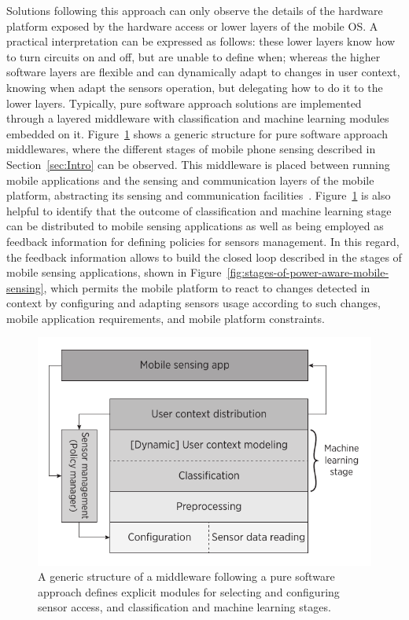 \documentclass[12pt]{article}
\numberwithin{equation}{section}
\numberwithin{table}{section}
\numberwithin{figure}{section}
\begin{document}
Solutions following this approach can only observe the details of the hardware platform exposed by the hardware access or lower layers of the mobile OS.
A practical interpretation can be expressed as follows: these lower layers know how to turn circuits on and off, but are unable to define when; whereas the higher software layers are flexible and can dynamically adapt to changes in user context, knowing when adapt the sensors operation, but delegating how to do it to the lower layers.
Typically, pure software approach solutions are implemented through a layered middleware with classification and machine learning modules embedded on it.
Figure~\ref{fig:middleware-software-approach} shows a generic structure for pure software approach middlewares, where the different stages of mobile phone sensing described in Section~\ref{sec:Intro} can be observed.
This middleware is placed between running mobile applications and the sensing and communication layers of the mobile platform, abstracting its sensing and communication facilities~\cite{Yurur2014}.
Figure~\ref{fig:middleware-software-approach} is also helpful to identify that the outcome of classification and machine learning stage can be distributed to mobile sensing applications as well as being employed as feedback information for defining policies for sensors management.
In this regard, the feedback information allows to build the closed loop described in the stages of mobile sensing applications, shown in Figure~\ref{fig:stages-of-power-aware-mobile-sensing}, which permits the mobile platform to react to changes detected in context by configuring and adapting sensors usage according to such changes, mobile application requirements, and mobile platform constraints.
\begin{figure}
  \centering
  \includegraphics[width=0.5\columnwidth]{generic-middleware-architecture}
  \caption{A generic structure of a middleware following a pure software approach defines explicit modules for selecting and configuring sensor access, and classification and machine learning stages.}
  \label{fig:middleware-software-approach}
\end{figure}





\end{document}
